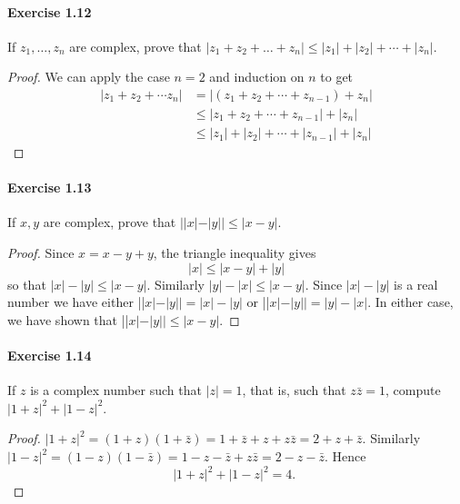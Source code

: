 \documentclass{article}
\theoremstyle{definition}
\begin{document}
\paragraph{Exercise 1.12} If $z_1, \ldots, z_n$ are complex, prove that $|z_1 + z_2 + \ldots + z_n| \leq |z_1| + |z_2| + \cdots + |z_n|$.
\begin{proof}
    We can apply the case $n=2$ and induction on $n$ to get
$$
\begin{aligned}
\left|z_1+z_2+\cdots z_n\right| &=\left|\left(z_1+z_2+\cdots+z_{n-1}\right)+z_n\right| \\
& \leq\left|z_1+z_2+\cdots+z_{n-1}\right|+\left|z_n\right| \\
& \leq\left|z_1\right|+\left|z_2\right|+\cdots+\left|z_{n-1}\right|+\left|z_n\right|
\end{aligned}
$$
\end{proof}


\paragraph{Exercise 1.13} If $x, y$ are complex, prove that $||x|-|y|| \leq |x-y|$.
\begin{proof}
    Since $x=x-y+y$, the triangle inequality gives
$$
|x| \leq|x-y|+|y|
$$
so that $|x|-|y| \leq|x-y|$. Similarly $|y|-|x| \leq|x-y|$. Since $|x|-|y|$ is a real number we have either ||$x|-| y||=|x|-|y|$ or ||$x|-| y||=|y|-|x|$. In either case, we have shown that ||$x|-| y|| \leq|x-y|$.
\end{proof}


\paragraph{Exercise 1.14} If $z$ is a complex number such that $|z|=1$, that is, such that $z \bar{z}=1$, compute $|1+z|^{2}+|1-z|^{2}$.
\begin{proof}
    $|1+z|^2=(1+z)(1+\bar{z})=1+\bar{z}+z+z \bar{z}=2+z+\bar{z}$. Similarly $|1-z|^2=(1-z)(1-\bar{z})=1-z-\bar{z}+z \bar{z}=2-z-\bar{z}$. Hence
$$
|1+z|^2+|1-z|^2=4 \text {. }
$$
\end{proof}
\end{document}
